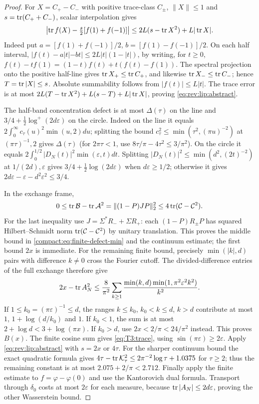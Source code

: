 \begin{proof}
For $X=C_+-C_-$ with positive trace-class $C_\pm$, $\|X\|\le1$ and
$s=\operatorname{tr}(C_++C_-)$, scalar interpolation gives
\begin{equation}\label{eq:rev:lip:abstract}
\left|\operatorname{tr} f(X)-\tfrac s2[f(1)+f(-1)]\right|
\le2L(s-\operatorname{tr} X^2)+L|\operatorname{tr} X|.
\end{equation}
Indeed put $a=[f(1)+f(-1)]/2$, $b=[f(1)-f(-1)]/2$.
On each half interval,
$|f(t)-a|t|-bt|\le2L|t|(1-|t|)$, by writing, for $t\ge0$,
$f(t)-tf(1)=(1-t)f(t)+t(f(t)-f(1))$.
The spectral projection onto the positive half-line gives
$\operatorname{tr} X_+\le\operatorname{tr} C_+$, and likewise $\operatorname{tr} X_-\le\operatorname{tr} C_-$; hence
$T=\operatorname{tr}|X|\le s$. Absolute summability follows from $|f(t)|\le L|t|$.
The trace error is at most
$2L(T-\operatorname{tr} X^2)+L(s-T)+L|\operatorname{tr} X|$, proving \eqref{eq:rev:lip:abstract}.

The half-band concentration defect is at most $\Delta(\tau)$ on the
line and $3/4+\tfrac12\log^+(2d\varepsilon)$ on the circle.
Indeed on the line it equals
$2\int_0^\infty c_\tau(u)^2\min(u,2)du$; splitting the bound
$c_\tau^2\le\min(\tau^2,(\pi u)^{-2})$ at $(\pi\tau)^{-1},2$
gives $\Delta(\tau)$ (for $2\pi\tau<1$, use
$8\tau/\pi-4\tau^2\le3/\pi^2$).
On the circle it equals
$2\int_0^{1/2}|D_N(t)|^2\min(\varepsilon,t)dt$.
Splitting $|D_N(t)|^2\le\min(d^2,(2t)^{-2})$ at $1/(2d),\varepsilon$
gives $3/4+\tfrac12\log(2d\varepsilon)$ when $d\varepsilon\ge1/2$;
otherwise it gives $2d\varepsilon-\varepsilon-d^2\varepsilon^2\le3/4$.

In the exchange frame,
\[
0\le\operatorname{tr}\mathcal B-\operatorname{tr}\mathcal A^2
=\|(1-P)JP\|_2^2\le4\operatorname{tr}(\mathcal C-\mathcal C^2).
\]
For the last inequality use $J=\Sigma^*R_-+\Sigma R_+$:
each $(1-P)R_\pm P$ has squared Hilbert--Schmidt norm
$\operatorname{tr}(\mathcal C-\mathcal C^2)$ by unitary translation.
This proves the middle bound in \eqref{compact:eq:finite-defect-min}
and the continuum estimate; the first bound $2x$ is immediate.
For the remaining finite bound, precisely $\min(|k|,d)$ pairs with
difference $k\ne0$ cross the Fourier cutoff. The divided-difference
entries of the full exchange therefore give
\[
2x-\operatorname{tr} A_N^2\le\frac8{\pi^2}
\sum_{k\ge1}\frac{\min(k,d)\min(1,\pi^2\varepsilon^2k^2)}{k^2}.
\]
If $1\le k_0=(\pi\varepsilon)^{-1}\le d$, the ranges
$k\le k_0$, $k_0<k\le d$, $k>d$ contribute at most
$1$, $1+\log(d/k_0)$ and $1$. If $k_0<1$, the sum is at most
$2+\log d<3+\log(\pi x)$. If $k_0>d$, use
$2x<2/\pi<24/\pi^2$ instead. This proves $B(x)$.
The finite cosine sum gives \eqref{eq:T3:trace}, using
$\sin(\pi\varepsilon)\ge2\varepsilon$.
Apply \eqref{eq:rev:lip:abstract} with $s=2x$ or $4\tau$.
For the sharper continuum bound the exact quadratic formula gives
$4\tau-\operatorname{tr}\mathcal K_\tau^2\le2\pi^{-2}\log\tau+1.0375$ for
$\tau\ge2$; thus the remaining constant is at most
$2.075+2/\pi<2.712$.
Finally apply the finite estimate to $f=\varphi-\varphi(0)$ and use
the Kantorovich dual formula. Transport through $\delta_0$ costs at
most $2\varepsilon$ for each measure, because
$\operatorname{tr}|A_N|\le2d\varepsilon$, proving the other Wasserstein bound.
\end{proof}


